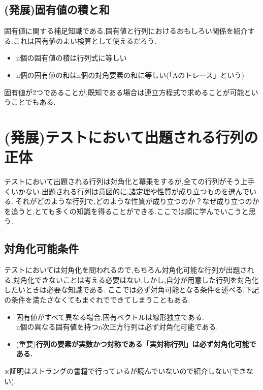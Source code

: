 \subsection{(発展)固有値の積と和}
固有値に関する補足知識である.固有値と行列におけるおもしろい関係を紹介する.これは固有値のよい検算として使えるだろう.
\begin{tcolorbox}[colframe=black!80,colback=white,title=行列式と要素に現れる固有値のヒント]
\begin{itemize}
    \item n個の固有値の積は行列式に等しい
    \item n個の固有値の和はn個の対角要素の和に等しい(「Aのトレース」という)
\end{itemize}
\end{tcolorbox}
\noindent
固有値が2つであることが,既知である場合は連立方程式で求めることが可能ということでもある.
\section{(発展)テストにおいて出題される行列の正体}
\label{sec:spectral}
テストにおいて出題される行列は対角化と冪乗をするが,全ての行列がそう上手くいかない.出題される行列は意図的に,諸定理や性質が成り立つものを選んでいる.
それがどのような行列で,どのような性質が成り立つのか？なぜ成り立つのかを追うと,とても多くの知識を得ることができる.ここでは順に学んでいこうと思う.
\hypertarget{parametric}{}
\subsection{対角化可能条件}
テストにおいては対角化を問われるので,もちろん対角化可能な行列が出題される.対角化できないことは考える必要はない.しかし,自分が用意した行列を対角化したいときは必要な知識である.
ここでは必ず対角可能となる条件を述べる.下記の条件を満たさなくてもまぐれでできてしまうこともある.
\begin{tcolorbox}[colframe=black!80,colback=white,title=対角可能条件]
\begin{itemize}
    \item 固有値がすべて異なる場合,固有ベクトルは線形独立である.\\
     n個の異なる固有値を持つn次正方行列は必ず対角化可能である.
    \item (重要)\textbf{行列の要素が実数かつ対称である「実対称行列」は必ず対角化可能である.}
\end{itemize}
\end{tcolorbox}
※証明はストラングの書籍\cite{strang}で行っているが読んでいないので紹介しない(できない).

